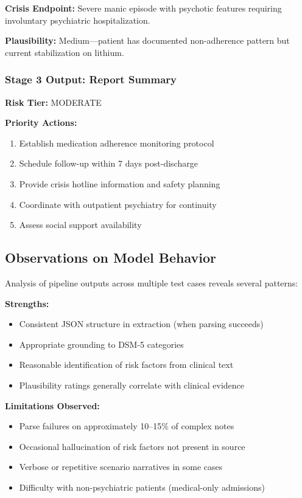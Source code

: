 \documentclass[conference]{IEEEtran}
\begin{document}
\textbf{Crisis Endpoint:} Severe manic episode with psychotic features requiring involuntary psychiatric hospitalization.

\textbf{Plausibility:} Medium---patient has documented non-adherence pattern but current stabilization on lithium.

\subsubsection{Stage 3 Output: Report Summary}
\textbf{Risk Tier:} MODERATE

\textbf{Priority Actions:}
\begin{enumerate}
\item Establish medication adherence monitoring protocol
\item Schedule follow-up within 7 days post-discharge
\item Provide crisis hotline information and safety planning
\item Coordinate with outpatient psychiatry for continuity
\item Assess social support availability
\end{enumerate}

\subsection{Observations on Model Behavior}

Analysis of pipeline outputs across multiple test cases reveals several patterns:

\textbf{Strengths:}
\begin{itemize}
\item Consistent JSON structure in extraction (when parsing succeeds)
\item Appropriate grounding to DSM-5 categories
\item Reasonable identification of risk factors from clinical text
\item Plausibility ratings generally correlate with clinical evidence
\end{itemize}

\textbf{Limitations Observed:}
\begin{itemize}
\item Parse failures on approximately 10--15\% of complex notes
\item Occasional hallucination of risk factors not present in source
\item Verbose or repetitive scenario narratives in some cases
\item Difficulty with non-psychiatric patients (medical-only admissions)
\end{itemize}
\end{document}
